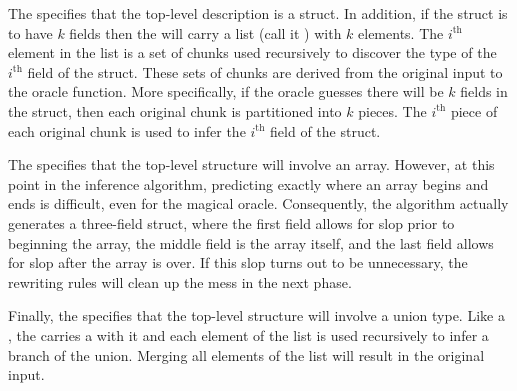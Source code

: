 The  specifies that the top-level description is a
struct.  In addition, if the struct is to have $k$ fields then the
 will carry a list (call it ) with $k$
elements.  The $i^{\mathrm{th}}$ element in the list is a set of
chunks used recursively to discover the type of the $i^{\mathrm{th}}$
field of the struct.  These sets of chunks are derived from the
original input to the oracle function. More specifically, if the
oracle guesses there will be $k$ fields in the struct, then each original
chunk is partitioned into $k$ pieces. The $i^{\mathrm{th}}$ piece of
each original chunk is used to infer the $i^{\mathrm{th}}$ field of
the struct.

The  specifies that the top-level structure will
involve an array.  However, at this point in the inference algorithm,
predicting exactly where an array begins and ends is difficult, even
for the magical oracle.  Consequently, the algorithm actually
generates a three-field struct, where the first field allows for slop
prior to beginning the array, the middle field is the array itself,
and the last field allows for slop after the array is over.  If this
slop turns out to be unnecessary, the rewriting rules will clean up
the mess in the next phase.

Finally, the  specifies that the top-level structure will
involve a union type.  Like a , the 
carries a  with it and each element of the list is 
used recursively to infer a branch of the union.  Merging all elements
of the list will result in the original input.

